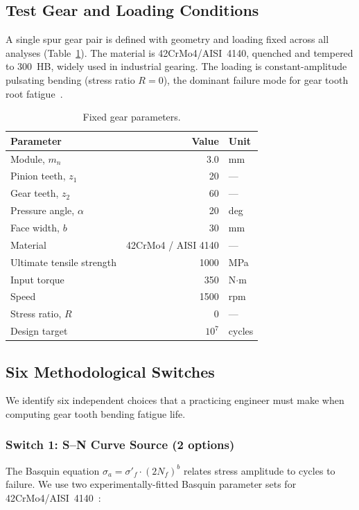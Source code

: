 \documentclass[12pt,a4paper]{article}
\begin{document}
\subsection{Test Gear and Loading Conditions}

A single spur gear pair is defined with geometry and loading fixed
across all analyses (Table~\ref{tab:gear}). The material is
42CrMo4/AISI~4140, quenched and tempered to 300~HB, widely used in
industrial gearing. The loading is constant-amplitude pulsating bending
(stress ratio $R=0$), the dominant failure mode for gear tooth root
fatigue~\cite{iso6336}.

\begin{table}[h]
\centering
\caption{Fixed gear parameters.}
\label{tab:gear}
\begin{tabular}{lrl}
\toprule
Parameter & Value & Unit \\
\midrule
Module, $m_n$ & 3.0 & mm \\
Pinion teeth, $z_1$ & 20 & --- \\
Gear teeth, $z_2$ & 60 & --- \\
Pressure angle, $\alpha$ & 20 & deg \\
Face width, $b$ & 30 & mm \\
Material & 42CrMo4 / AISI 4140 & --- \\
Ultimate tensile strength & 1000 & MPa \\
Input torque & 350 & N$\cdot$m \\
Speed & 1500 & rpm \\
Stress ratio, $R$ & 0 & --- \\
Design target & $10^7$ & cycles \\
\bottomrule
\end{tabular}
\end{table}

\subsection{Six Methodological Switches}

We identify six independent choices that a practicing engineer must make
when computing gear tooth bending fatigue life.

\subsubsection{Switch 1: S--N Curve Source (2 options)}

The Basquin equation $\sigma_a = \sigma'_f \cdot (2N_f)^b$ relates stress
amplitude to cycles to failure. We use two experimentally-fitted Basquin
parameter sets for 42CrMo4/AISI~4140~\cite{matweb, mmpds}:
\end{document}
